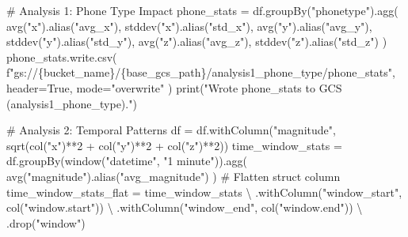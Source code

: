 \documentclass[
  letterpaper,
  DIV=11,
  numbers=noendperiod]{scrartcl}
\newenvironment{Shaded}{\begin{snugshade}}{\end{snugshade}}
\newcommand{\BuiltInTok}[1]{\textcolor[rgb]{0.98,0.46,0.51}{#1}}
\newcommand{\CommentTok}[1]{\textcolor[rgb]{0.42,0.45,0.49}{#1}}
\newcommand{\DecValTok}[1]{\textcolor[rgb]{0.47,0.72,1.00}{#1}}
\newcommand{\NormalTok}[1]{\textcolor[rgb]{0.88,0.89,0.91}{#1}}
\newcommand{\OperatorTok}[1]{\textcolor[rgb]{0.88,0.89,0.91}{#1}}
\newcommand{\SpecialCharTok}[1]{\textcolor[rgb]{0.47,0.72,1.00}{#1}}
\newcommand{\SpecialStringTok}[1]{\textcolor[rgb]{0.62,0.80,1.00}{#1}}
\newcommand{\StringTok}[1]{\textcolor[rgb]{0.62,0.80,1.00}{#1}}
\newcommand{\VariableTok}[1]{\textcolor[rgb]{1.00,0.67,0.44}{#1}}
\begin{document}
\begin{Shaded}
\begin{Highlighting}[]
    \CommentTok{\# Analysis 1: Phone Type Impact}
\NormalTok{    phone\_stats }\OperatorTok{=}\NormalTok{ df.groupBy(}\StringTok{"phonetype"}\NormalTok{).agg(}
\NormalTok{        avg(}\StringTok{"x"}\NormalTok{).alias(}\StringTok{"avg\_x"}\NormalTok{),}
\NormalTok{        stddev(}\StringTok{"x"}\NormalTok{).alias(}\StringTok{"std\_x"}\NormalTok{),}
\NormalTok{        avg(}\StringTok{"y"}\NormalTok{).alias(}\StringTok{"avg\_y"}\NormalTok{),}
\NormalTok{        stddev(}\StringTok{"y"}\NormalTok{).alias(}\StringTok{"std\_y"}\NormalTok{),}
\NormalTok{        avg(}\StringTok{"z"}\NormalTok{).alias(}\StringTok{"avg\_z"}\NormalTok{),}
\NormalTok{        stddev(}\StringTok{"z"}\NormalTok{).alias(}\StringTok{"std\_z"}\NormalTok{)}
\NormalTok{    )}
\NormalTok{    phone\_stats.write.csv(}
        \SpecialStringTok{f"gs://}\SpecialCharTok{\{}\NormalTok{bucket\_name}\SpecialCharTok{\}}\SpecialStringTok{/}\SpecialCharTok{\{}\NormalTok{base\_gcs\_path}\SpecialCharTok{\}}\SpecialStringTok{/analysis1\_phone\_type/phone\_stats"}\NormalTok{,}
\NormalTok{        header}\OperatorTok{=}\VariableTok{True}\NormalTok{,}
\NormalTok{        mode}\OperatorTok{=}\StringTok{"overwrite"}
\NormalTok{    )}
    \BuiltInTok{print}\NormalTok{(}\StringTok{"Wrote phone\_stats to GCS (analysis1\_phone\_type)."}\NormalTok{)}

    \CommentTok{\# Analysis 2: Temporal Patterns}
\NormalTok{    df }\OperatorTok{=}\NormalTok{ df.withColumn(}\StringTok{"magnitude"}\NormalTok{, sqrt(col(}\StringTok{"x"}\NormalTok{)}\OperatorTok{**}\DecValTok{2} \OperatorTok{+}\NormalTok{ col(}\StringTok{"y"}\NormalTok{)}\OperatorTok{**}\DecValTok{2} \OperatorTok{+}\NormalTok{ col(}\StringTok{"z"}\NormalTok{)}\OperatorTok{**}\DecValTok{2}\NormalTok{))}
\NormalTok{    time\_window\_stats }\OperatorTok{=}\NormalTok{ df.groupBy(window(}\StringTok{"datetime"}\NormalTok{, }\StringTok{"1 minute"}\NormalTok{)).agg(}
\NormalTok{        avg(}\StringTok{"magnitude"}\NormalTok{).alias(}\StringTok{"avg\_magnitude"}\NormalTok{)}
\NormalTok{    )}
    \CommentTok{\# Flatten struct column}
\NormalTok{    time\_window\_stats\_flat }\OperatorTok{=}\NormalTok{ time\_window\_stats }\OperatorTok{\textbackslash{}}
\NormalTok{        .withColumn(}\StringTok{"window\_start"}\NormalTok{, col(}\StringTok{"window.start"}\NormalTok{)) }\OperatorTok{\textbackslash{}}
\NormalTok{        .withColumn(}\StringTok{"window\_end"}\NormalTok{, col(}\StringTok{"window.end"}\NormalTok{)) }\OperatorTok{\textbackslash{}}
\NormalTok{        .drop(}\StringTok{"window"}\NormalTok{)}


\end{Highlighting}
\end{Shaded}
\end{document}
